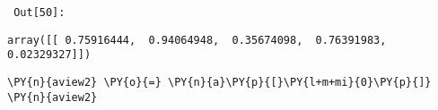         {\par%
        \vspace{-1\smallerfontscale}%
        \noindent%
        \begin{minipage}{\cellleftmargin}%
    \hfill%
    {\smaller%
    \tt%
    \color{nbframe-out-prompt}%
    Out[50]:}%
    \hspace{\inputpadding}%
    \hspace{0em}%
    \hspace{3pt}%
    \end{minipage}%
        }%
    \begin{addmargin}[\cellleftmargin]{0em}%
    {\smaller%
    \vspace{-1\smallerfontscale}%
    
    
    
    \begin{verbatim}
array([[ 0.75916444,  0.94064948,  0.35674098,  0.76391983,  0.02329327]])
    \end{verbatim}

    
}%
    \end{addmargin}%

{\par%
\vspace{-1\baselineskip}%
}%
\begin{notebookcell}[51]%
\begin{addmargin}[\cellleftmargin]{0em}%
{\smaller%
\par%
%
\vspace{-1\smallerfontscale}%
\begin{Verbatim}[commandchars=\\\{\}]
\PY{n}{aview2} \PY{o}{=} \PY{n}{a}\PY{p}{[}\PY{l+m+mi}{0}\PY{p}{]}
\PY{n}{aview2}
\end{Verbatim}
%
\par%
\vspace{-1\smallerfontscale}}%
\end{addmargin}
\end{notebookcell}

\par\vspace{1\smallerfontscale}%
    
